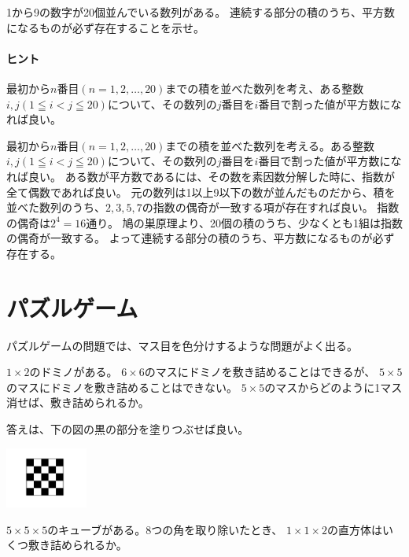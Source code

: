 \documentclass[uplatex,dvipdfmx]{jsbook}
\begin{document}
\begin{problem}[練習問題2]
    1から9の数字が20個並んでいる数列がある。
    連続する部分の積のうち、平方数になるものが必ず存在することを示せ。
\end{problem}

\paragraph{ヒント}最初から$n$番目$(n=1,2,\dots,20)$までの積を並べた数列を考え、ある整数$i,j( 1 \leqq i < j \leqq 20 )$について、その数列の$j$番目を$i$番目で割った値が平方数になれば良い。

\begin{answer}
    最初から$n$番目$(n=1,2,\dots,20)$までの積を並べた数列を考える。ある整数$i,j( 1 \leqq i < j \leqq 20 )$について、その数列の$j$番目を$i$番目で割った値が平方数になれば良い。
    ある数が平方数であるには、その数を素因数分解した時に、指数が全て偶数であれば良い。
    元の数列は1以上9以下の数が並んだものだから、積を並べた数列のうち、$2,3,5,7$の指数の偶奇が一致する項が存在すれば良い。
    指数の偶奇は$2^4=16$通り。
    鳩の巣原理より、20個の積のうち、少なくとも1組は指数の偶奇が一致する。
    よって連続する部分の積のうち、平方数になるものが必ず存在する。
\end{answer}

\section{パズルゲーム}

パズルゲームの問題では、マス目を色分けするような問題がよく出る。

\begin{problem}[例題]
    $1\times 2$のドミノがある。
    $6\times 6$のマスにドミノを敷き詰めることはできるが、
    $5\times 5$のマスにドミノを敷き詰めることはできない。
    $5\times 5$のマスからどのように1マス消せば、敷き詰められるか。

    答えは、下の図の黒の部分を塗りつぶせば良い。

    \includegraphics[clip,height=2cm]{figures/c_example.pdf}
\end{problem}

\begin{problem}[練習問題1]
    $5 \times 5 \times 5$のキューブがある。8つの角を取り除いたとき、
    $1 \times 1 \times 2$の直方体はいくつ敷き詰められるか。
\end{problem}
\end{document}
